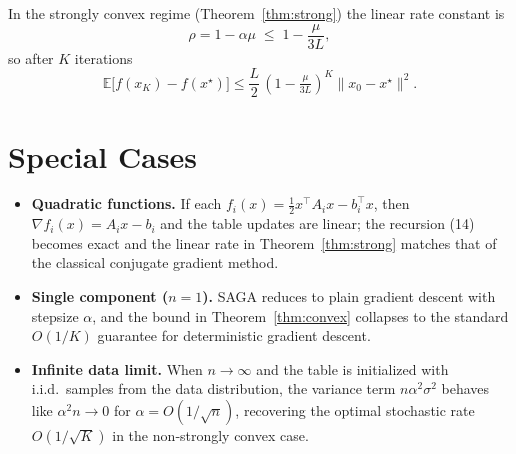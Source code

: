 \documentclass{article}
\newcommand{\E}{\mathbb{E}}
\begin{document}
In the strongly convex regime (Theorem~\ref{thm:strong}) the linear rate constant is
\[
\rho = 1-\alpha\mu\;\le\; 1-\frac{\mu}{3L},
\]
so after $K$ iterations
\[
\E\bigl[f(x_K)-f(x^{\star})\bigr]\le
\frac{L}{2}\,(1-\tfrac{\mu}{3L})^{K}\|x_0-x^{\star}\|^{2}.
\]

\section*{Special Cases}
\begin{itemize}[leftmargin=*]
\item \textbf{Quadratic functions.} If each $f_i(x)=\frac12 x^{\top}A_i x-b_i^{\top}x$, then $\nabla f_i(x)=A_i x-b_i$ and the table updates are linear; the recursion (14) becomes exact and the linear rate in Theorem~\ref{thm:strong} matches that of the classical conjugate gradient method.
\item \textbf{Single component ($n=1$).} SAGA reduces to plain gradient descent with stepsize $\alpha$, and the bound in Theorem~\ref{thm:convex} collapses to the standard $O(1/K)$ guarantee for deterministic gradient descent.
\item \textbf{Infinite data limit.} When $n\to\infty$ and the table is initialized with i.i.d.\ samples from the data distribution, the variance term $n\alpha^{2}\sigma^{2}$ behaves like $\alpha^{2}n\to0$ for $\alpha=O(1/\sqrt{n})$, recovering the optimal stochastic rate $O(1/\sqrt{K})$ in the non‑strongly convex case.
\end{itemize}
\end{document}
